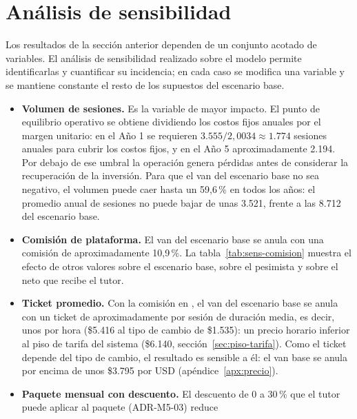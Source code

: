 \section{Análisis de sensibilidad}\label{sec:sensibilidad}

Los resultados de la sección anterior dependen de un conjunto acotado de
variables. El análisis de sensibilidad realizado sobre el modelo permite
identificarlas y cuantificar su incidencia; en cada caso se modifica una
variable y se mantiene constante el resto de los supuestos del escenario
base.

\begin{itemize}
    \item \textbf{Volumen de sesiones.} Es la variable de mayor impacto.
          El punto de equilibrio operativo se obtiene dividiendo los
          costos fijos anuales por el margen unitario: en el Año 1 se
          requieren $3.555 / 2{,}0034 \approx 1.774$ sesiones anuales para
          cubrir los costos fijos, y en el Año 5 aproximadamente 2.194.
          Por debajo de ese umbral la operación genera pérdidas antes de
          considerar la recuperación de la inversión. Para que el
          \gls{van} del escenario base no sea negativo, el volumen puede
          caer hasta un 59,6\,\% en todos los años: el promedio anual de
          sesiones no puede bajar de unas 3.521, frente a las 8.712 del
          escenario base.
    \item \textbf{Comisión de plataforma.} El \gls{van} del escenario base
          se anula con una comisión de aproximadamente 10,9\,\%. La
          tabla~\ref{tab:sens-comision} muestra el efecto de otros valores
          sobre el escenario base, sobre el pesimista y sobre el neto que
          recibe el tutor.
    \item \textbf{Ticket promedio.} Con la comisión en \comision{}, el
          \gls{van} del escenario base se anula con un ticket de
          aproximadamente  por sesión de duración media, es
          decir, unos  por hora (\$5.416 al tipo de cambio de
          \$1.535): un precio horario inferior al piso de tarifa del
          sistema (\$6.140, sección~\ref{sec:piso-tarifa}).
          Como el ticket depende del tipo de cambio, el resultado es
          sensible a él: el \gls{van} base se anula por encima de unos
          \$3.795 por USD (apéndice~\ref{apx:precio}).
    \item \textbf{Paquete mensual con descuento.} El descuento de 0 a
          30\,\% que el tutor puede aplicar al paquete (ADR-M5-03) reduce

\end{itemize}
